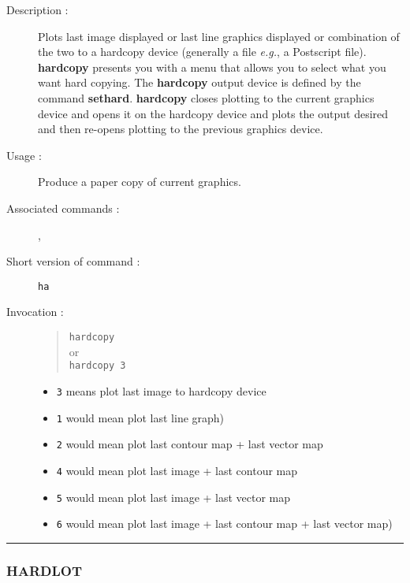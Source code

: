 \begin{description}

\item[Description :] Plots last image displayed or last line graphics
displayed or combination of the two to a hardcopy device (generally a
file \emph{e.g.}, a Postscript file).  {\bf hardcopy} presents you with
a menu that allows you to select what you want hard copying.  The {\bf
hardcopy} output device is defined by the command {\bf sethard}.  {\bf
hardcopy} closes plotting to the current graphics device and opens it
on the hardcopy device and plots the output desired and then re-opens
plotting to the previous graphics device.

\item[Usage :] Produce a paper copy of current graphics.
\item[Associated commands :] {\tt {}},
{\tt {}}
\item[Short version of command :] {\tt ha}
\item[Invocation :]

\begin{quote}{\tt  hardcopy }\\
or \\
{\tt hardcopy 3 }
\end{quote}

\begin{itemize}
\item {\tt 3} means plot last image to hardcopy device
\item {\tt 1} would mean plot last line graph)
\item {\tt 2} would mean plot last contour map + last vector map
\item {\tt 4} would mean plot last image + last contour map
\item {\tt 5} would mean plot last image + last vector map
\item {\tt 6} would mean plot last image + last contour map + last vector map)
\end{itemize}

\end{description}

\hrule
\subsubsection*{\label{HARDLOT}HARDLOT}

